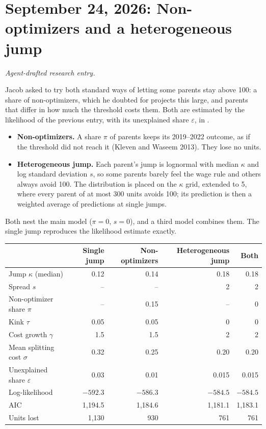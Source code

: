 \clearpage
\section*{September 24, 2026: Non-optimizers and a heterogeneous jump}
\textit{Agent-drafted research entry.}

Jacob asked to try both standard ways of letting some parents stay above 100:
a share of non-optimizers, which he doubted for projects this large, and
parents that differ in how much the threshold costs them. Both are estimated
by the likelihood of the previous entry, with its unexplained share
$\varepsilon$, in .

\begin{itemize}
\item \textbf{Non-optimizers.} A share $\pi$ of parents keeps its 2019--2022
outcome, as if the threshold did not reach it (Kleven and Waseem 2013). They
lose no units.
\item \textbf{Heterogeneous jump.} Each parent's jump is lognormal with median
$\kappa$ and log standard deviation $s$, so some parents barely feel the wage
rule and others always avoid 100. The distribution is placed on the $\kappa$
grid, extended to 5, where every parent of at most 300 units avoids 100; its
prediction is then a weighted average of predictions at single jumps.
\end{itemize}

Both nest the main model ($\pi=0$, $s=0$), and a third model combines them.
The single jump reproduces the likelihood estimate exactly.

\begin{center}
\small
\begin{tabular}{lrrrr}
\hline
 & Single jump & Non-optimizers & Heterogeneous jump & Both \\
\hline
Jump $\kappa$ (median) & 0.12 & 0.14 & 0.18 & 0.18 \\
Spread $s$ & -- & -- & 2 & 2 \\
Non-optimizer share $\pi$ & -- & 0.15 & -- & 0 \\
Kink $\tau$ & 0.05 & 0.05 & 0 & 0 \\
Cost growth $\gamma$ & 1.5 & 1.5 & 2 & 2 \\
Mean splitting cost $\sigma$ & 0.32 & 0.25 & 0.20 & 0.20 \\
Unexplained share $\varepsilon$ & 0.03 & 0.01 & 0.015 & 0.015 \\
Log-likelihood & $-592.3$ & $-586.3$ & $-584.5$ & $-584.5$ \\
AIC & 1,194.5 & 1,184.6 & 1,181.1 & 1,183.1 \\
Units lost & 1,130 & 930 & 761 & 761 \\
\hline
\end{tabular}
\end{center}

